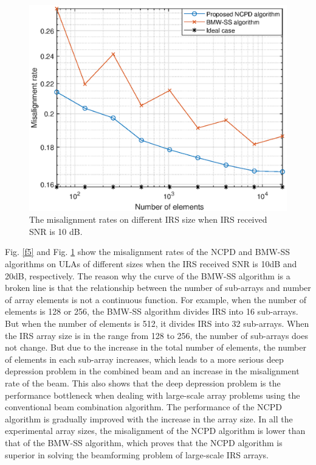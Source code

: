 \documentclass[12pt,draftclsnofoot,onecolumn]{IEEEtran}
\begin{document}
	\begin{figure}
		\centering
		\includegraphics[width=.5\textwidth]{misrate_ant_10.eps}
		\caption{  The misalignment rates on different IRS size when IRS received SNR is 10 dB. }  \label{f6} 	
	\end{figure}
	
	Fig. \ref{f5} and Fig. \ref{f6} show the misalignment rates of the NCPD  and  BMW-SS algorithms on ULAs of different sizes when the IRS received SNR is 10dB and 20dB, respectively. The reason why the curve of the BMW-SS algorithm is a broken line is that  the relationship between the number of sub-arrays and  number of array elements is not a continuous function. For example, when the number of elements is 128 or 256, the BMW-SS algorithm divides  IRS into 16 sub-arrays. But when the number of elements is 512, it divides  IRS into 32 sub-arrays. When the IRS array size is in the range from 128 to 256, the number of sub-arrays does not change. But due to the increase in the total number of elements, the number of elements in each sub-array increases, which leads to a more serious deep depression problem in the combined beam and an increase in the misalignment rate of the beam. This also shows that the deep depression problem is the performance bottleneck when dealing with large-scale array problems using the conventional beam combination algorithm. The performance of the NCPD algorithm is gradually improved with the increase in the array size. In all the experimental array sizes, the misalignment of the NCPD algorithm is lower than that of the BMW-SS algorithm, which proves that the NCPD algorithm is superior in solving the beamforming problem of large-scale IRS arrays.
	
	
	
	
	
	
	
	
	
	
	
\end{document}

